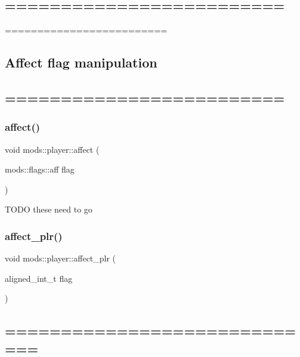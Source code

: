 \subsection*{========================= }

========================= \subsection*{Affect flag manipulation }

\subsection*{========================= }\mbox{\label{classmods_1_1player_a47a34f3be04cad723e561028c7ae24cd}} 
\subsubsection{\texorpdfstring{affect()}{affect()}\hspace{0.1cm}{\footnotesize\ttfamily [2/2]}}
{\footnotesize\ttfamily void mods\+::player\+::affect (\begin{DoxyParamCaption}\item[{mods\+::flags\+::aff}]{flag }\end{DoxyParamCaption})}

T\+O\+DO these need to go \mbox{\label{classmods_1_1player_acd374d4b3b772201c0ec8611fbbc9c4a}} 
\subsubsection{\texorpdfstring{affect\+\_\+plr()}{affect\_plr()}}
{\footnotesize\ttfamily void mods\+::player\+::affect\+\_\+plr (\begin{DoxyParamCaption}\item[{aligned\+\_\+int\+\_\+t}]{flag }\end{DoxyParamCaption})}

\subsection*{============================= }

